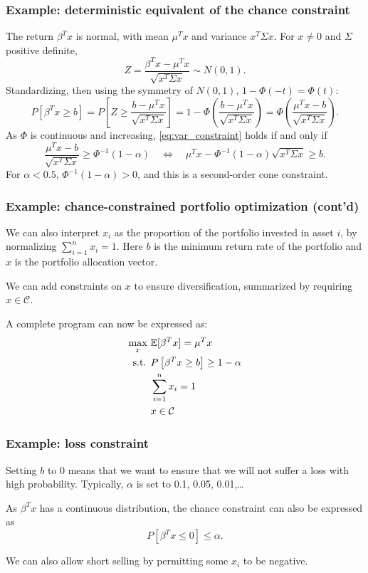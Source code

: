 \documentclass[aspectratio=169]{beamer}
\begin{document}
\begin{frame}
\frametitle{Example: deterministic equivalent of the chance constraint}

The return $\beta^T x$ is normal, with mean $\mu^T x$ and variance $x^T \Sigma x$.
For $x \neq 0$ and $\Sigma$ positive definite,
\[
Z = \frac{\beta^T x - \mu^T x}{\sqrt{x^T\Sigma x}} \sim N(0,1).
\]
Standardizing, then using the symmetry of $N(0,1)$, $1 - \Phi(-t) = \Phi(t)$:
\[
P\left[ \beta^T x \geq b \right]
= P\left[ Z \geq \frac{b - \mu^T x}{\sqrt{x^T\Sigma x}} \right]
= 1 - \Phi\left( \frac{b - \mu^T x}{\sqrt{x^T\Sigma x}} \right)
= \Phi\left( \frac{\mu^T x - b}{\sqrt{x^T\Sigma x}} \right).
\]
As $\Phi$ is continuous and increasing, \eqref{eq:var_constraint} holds if and only if
\[
\frac{\mu^T x - b}{\sqrt{x^T\Sigma x}} \geq \Phi^{-1}(1-\alpha)
\quad \Longleftrightarrow \quad
\mu^Tx - \Phi^{-1}(1-\alpha) \sqrt{x^T\Sigma x} \geq b.
\]
For $\alpha < 0.5$, $\Phi^{-1}(1-\alpha) > 0$, and this is a {\red second-order cone constraint}.

\end{frame}

\begin{frame}
\frametitle{Example: chance-constrained portfolio optimization (cont'd)}

We can also interpret $x_i$ as the proportion of the portfolio invested in asset $i$, by normalizing $\sum_{i=1}^n x_i = 1$.
Here $b$ is the minimum return rate of the portfolio and $x$ is the portfolio allocation vector.

\smallskip

We can add constraints on $x$ to ensure diversification, summarized by requiring $x \in \mathcal{C}$.

\smallskip

A complete program can now be expressed as:
\begin{align*}
\max_x \ & {\mathbb{E}}[\beta^T x] = \mu^T x \\
\text{s.t. } & P\left[ \beta^T x \geq b \right] \geq 1-\alpha  \\
& \sum_{i = 1}^n x_i = 1 \\
& x \in {\mathcal{C}}
\end{align*}

\end{frame}

\begin{frame}
\frametitle{Example: loss constraint}

Setting $b$ to 0 means that we want to ensure that we will not suffer a loss with high probability. Typically, $\alpha$ is set to 0.1, 0.05, 0.01,\ldots

\smallskip

As $\beta^T x$ has a continuous distribution, the chance constraint can also be expressed as
\[
P\left[ \beta^T x \leq 0 \right] \leq \alpha.
\]

\smallskip

We can also allow short selling by permitting some $x_i$ to be negative.
\end{frame}
\end{document}

